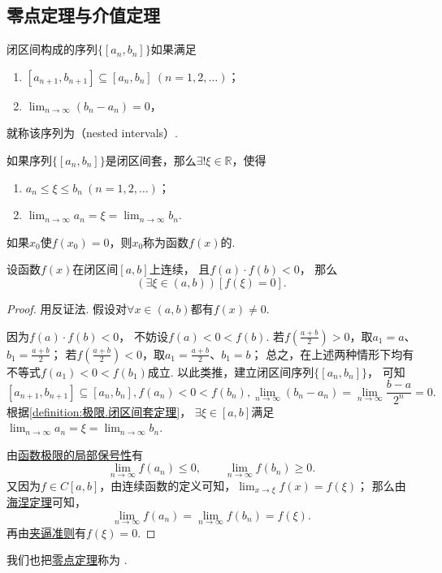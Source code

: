 \subsection{零点定理与介值定理}
\begin{definition}\label{definition:极限.闭区间套的定义}
闭区间构成的序列\(\{[a_n,b_n]\}\)如果满足
\begin{enumerate}
\item \([a_{n+1},b_{n+1}] \subseteq [a_n,b_n]\ (n=1,2,\dotsc)\)；
\item \(\lim_{n\to\infty} (b_n - a_n) = 0\)，
\end{enumerate}
就称该序列为（nested intervals）.
\end{definition}

\begin{theorem}\label{definition:极限.闭区间套定理}
如果序列\(\{[a_n,b_n]\}\)是闭区间套，那么\(\exists!\xi\in\mathbb{R}\)，使得
\begin{enumerate}
\item \(a_n \leq \xi \leq b_n\ (n=1,2,\dotsc)\)；
\item \(\lim_{n\to\infty} a_n
= \xi
= \lim_{n\to\infty} b_n\).
\end{enumerate}
\end{theorem}

\begin{definition}
如果\(x_0\)使\(f(x_0) = 0\)，则\(x_0\)称为函数\(f(x)\)的.
\end{definition}

\begin{theorem}[零点定理]\label{theorem:极限.零点定理}
设函数\(f(x)\)在闭区间\([a,b]\)上连续，
且\(f(a) \cdot f(b)<0\)，
那么\[
	(\exists\xi\in(a,b))[f(\xi) = 0].
\]
\begin{proof}
用反证法.
假设对\(\forall x\in(a,b)\)都有\(f(x) \neq 0\).

因为\(f(a) \cdot f(b)<0\)，
不妨设\(f(a) < 0 < f(b)\).
若\(f\left(\frac{a+b}{2}\right)>0\)，取\(a_1=a\)、\(b_1=\frac{a+b}{2}\)；
若\(f\left(\frac{a+b}{2}\right)<0\)，取\(a_1=\frac{a+b}{2}\)、\(b_1=b\)；
总之，在上述两种情形下均有不等式\(f(a_1) < 0 < f(b_1)\)成立.
以此类推，建立闭区间序列\(\{[a_n,b_n]\}\)，
可知\[
[a_{n+1},b_{n+1}] \subseteq [a_n,b_n],
f(a_n) < 0 < f(b_n),
\lim_{n\to\infty} (b_n - a_n)
= \lim_{n\to\infty} \frac{b-a}{2^n}
= 0.
\]
根据\cref{definition:极限.闭区间套定理}，
\(\exists\xi\in[a,b]\)满足\(\lim_{n\to\infty} a_n
= \xi
= \lim_{n\to\infty} b_n\).

由\hyperref[theorem:极限.函数极限的局部保号性3]{函数极限的局部保号性}有\[
\lim_{n\to\infty} f(a_n) \leq 0,
\qquad
\lim_{n\to\infty} f(b_n) \geq 0.
\]
又因为\(f \in C[a,b]\)，由连续函数的定义可知，\(\lim_{x\to\xi} f(x) = f(\xi)\)；
那么由\hyperref[theorem:极限.海涅定理]{海涅定理}可知，\[
\lim_{n\to\infty} f(a_n)
= \lim_{n\to\infty} f(b_n)
= f(\xi).
\]再由\hyperref[theorem:极限.夹逼准则]{夹逼准则}有\(f(\xi)=0\).
\end{proof}
\end{theorem}
我们也把\hyperref[theorem:极限.零点定理]{零点定理}称为%
.

